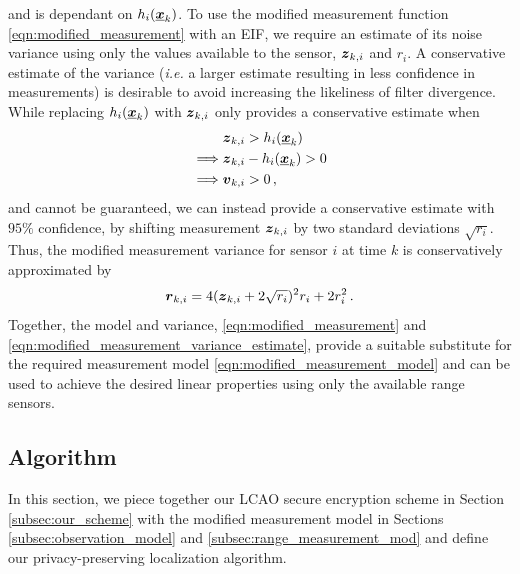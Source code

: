 \documentclass[10pt,letterpaper,oneside,twocolumn,journal]{IEEEtran}
\theoremstyle{definition}
\theoremstyle{definition}
\theoremstyle{remark}
\begin{document}
and is dependant on $h_i({\boldsymbol{\underline{x}}}_k)$. To use the modified measurement function \eqref{eqn:modified_measurement} with an EIF, we require an estimate of its noise variance using only the values available to the sensor, ${\boldsymbol{z}}_{k,i}$ and $r_i$. A conservative estimate of the variance (\textit{i.e.} a larger estimate resulting in less confidence in measurements) is desirable to avoid increasing the likeliness of filter divergence. While replacing $h_i({\boldsymbol{\underline{x}}}_k)$ with ${\boldsymbol{z}}_{k,i}$ only provides a conservative estimate when
\begin{equation}
    \begin{split}
        &{\boldsymbol{z}}_{k,i} > h_i({\boldsymbol{\underline{x}}}_k) \\
        \implies &{\boldsymbol{z}}_{k,i} - h_i({\boldsymbol{\underline{x}}}_k) > 0 \\
        \implies &{\boldsymbol{v}}_{k,i} > 0\,,
    \end{split}
\end{equation}
and cannot be guaranteed, we can instead provide a conservative estimate with $95\%$ confidence, by shifting measurement ${\boldsymbol{z}}_{k,i}$ by two standard deviations $\sqrt{r_i}$. Thus, the modified measurement variance for sensor $i$ at time $k$ is conservatively approximated by
\begin{equation}
    \rv{r}_{k, i} = 4(\rv{z}_{k,i} + 2\sqrt{r_i})^2r_i + 2r_i^2\,. \label{eqn:modified_measurement_variance_estimate}
\end{equation}
Together, the model and variance, \eqref{eqn:modified_measurement} and \eqref{eqn:modified_measurement_variance_estimate}, provide a suitable substitute for the required measurement model \eqref{eqn:modified_measurement_model} and can be used to achieve the desired linear properties using only the available range sensors.

% 
% 

\subsection{Algorithm} \label{subsec:algorithm}
In this section, we piece together our LCAO secure encryption scheme in Section \ref{subsec:our_scheme} with the modified measurement model in Sections \ref{subsec:observation_model} and \ref{subsec:range_measurement_mod} and define our privacy-preserving localization algorithm.
\end{document}
